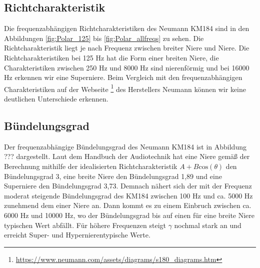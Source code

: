 \subsection{Richtcharakteristik}
Die frequenzabhängigen Richtcharakteristiken des Neumann KM184 sind in den Abbildungen \ref{fig:Polar_125} bis \ref{fig:Polar_allfreqs} zu sehen.
Die Richtcharakteristik liegt je nach Frequenz zwischen breiter Niere und Niere. 
Die Richtcharakteristiken bei 125 Hz hat die Form einer breiten Niere, die Charakteristiken zwischen 250 Hz und 8000 Hz sind nierenförmig und bei 16000 Hz erkennen wir eine Superniere.
Beim Vergleich mit den frequenzabhängigen Charakteristiken auf der Webseite \footnote{\url{https://www.neumann.com/assets/diagrams/s180_diagrams.htm}} des Herstellers Neumann können wir keine deutlichen Unterschiede erkennen.


\subsection{Bündelungsgrad}
Der frequenzabhängige Bündelungsgrad des Neumann KM184 ist in Abbildung ??? dargestellt. 
Laut dem Handbuch der Audiotechnik \cite{Weinzierl08} hat eine Niere gemäß der Berechnung mithilfe der idealisierten Richtcharakteristik $A + B \mathrm{cos}(\theta)$ den Bündelungsgrad 3, eine breite Niere den Bündelungsgrad 1,89 und eine Superniere den Bündelungsgrad 3,73.
Demnach nähert sich der mit der Frequenz moderat steigende Bündelungsgrad des KM184 zwischen 100 Hz und ca. 5000 Hz zunehmend dem einer Niere an.
Dann kommt es zu einem Einbruch zwischen ca. 6000 Hz und 10000 Hz, wo der Bündelungsgrad bis auf einen für eine breite Niere typischen Wert abfällt. 
Für höhere Frequenzen steigt $\gamma$ nochmal stark an und erreicht  Super- und Hypernierentypische Werte.



